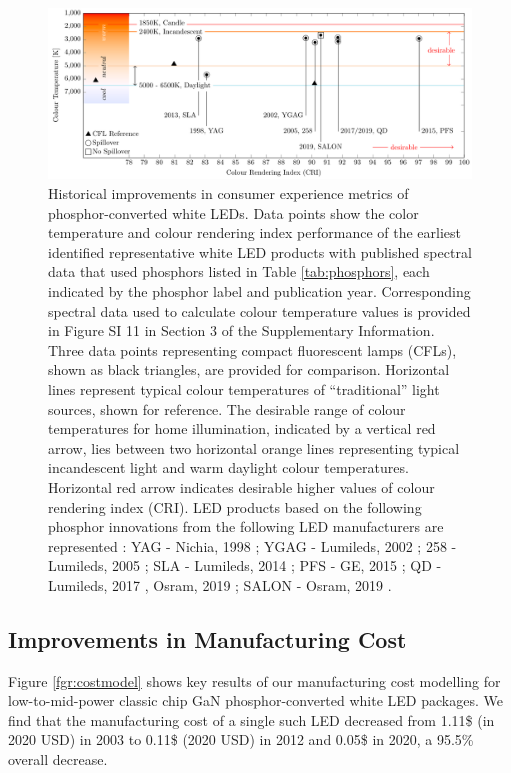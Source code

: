 \documentclass[journal=jacsat,manuscript=article]{achemso}
\begin{document}
\begin{figure}[h!]
 \centering
 \includegraphics[width=\textwidth]{figures/breakthroughs_consumer-experience.pdf}
 \caption{Historical improvements in consumer experience metrics of phosphor-converted white LEDs. Data points show the color temperature and colour rendering index performance of the earliest identified representative white LED products with published spectral data that used phosphors listed in Table \ref{tab:phosphors}, each indicated by the phosphor label and publication year. Corresponding spectral data used to calculate colour temperature values is provided in Figure SI 11 in Section 3 of the Supplementary Information. Three data points representing compact fluorescent lamps (CFLs)\cite{cie_reference}, shown as black triangles, are provided for comparison. Horizontal lines represent typical colour temperatures of “traditional” light sources, shown for reference. The desirable range of colour temperatures for home illumination, indicated by a vertical red arrow, lies between two horizontal orange lines representing typical incandescent light and warm daylight colour temperatures. Horizontal red arrow indicates desirable higher values of colour rendering index (CRI). LED products based on the following phosphor innovations from the following LED manufacturers are represented : YAG - Nichia, 1998 \cite{bando1998development}; YGAG - Lumileds, 2002 \cite{Mueller2002}; 258 - Lumileds, 2005 \cite{MuellerMach2005}; SLA - Lumileds, 2014 \cite{Pust2014}; PFS - GE, 2015 \cite{Murphy2015}; QD - Lumileds, 2017 \cite{lumileds2016qd}, Osram, 2019 \cite{osram2019qd}; SALON - Osram, 2019 \cite{Hoerder2019}.}
 \label{fgr:consumer_experience}
\end{figure}

\subsection{Improvements in Manufacturing Cost}

Figure \ref{fgr:costmodel} shows key results of our manufacturing cost modelling for low-to-mid-power classic chip GaN phosphor-converted white LED packages. We find that the manufacturing cost of a single such LED decreased from 1.11\$ (in 2020 USD) in 2003 to 0.11\$ (2020 USD) in 2012 and 0.05\$ in 2020, a 95.5\% overall decrease.
\end{document}

